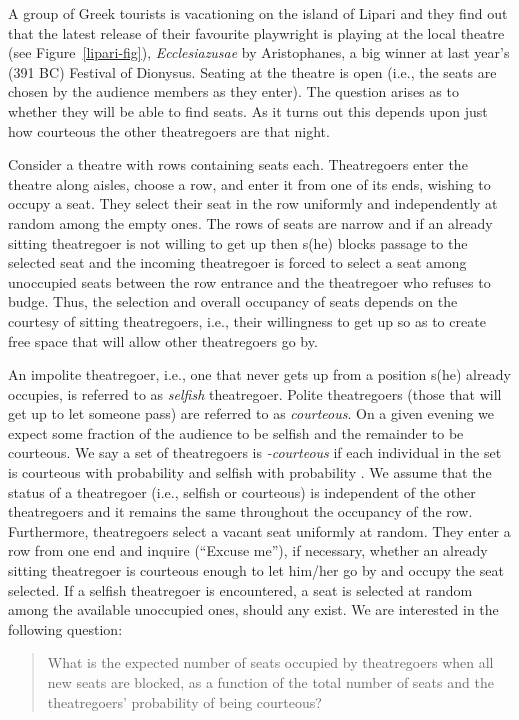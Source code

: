 \documentclass[11pt]{llncs}
\begin{document}
A group of Greek tourists is vacationing on the island of Lipari and they find
out that the latest release of their favourite playwright is playing 
at the local theatre (see Figure~\ref{lipari-fig}), {\em Ecclesiazusae} by Aristophanes, a big winner at last year's (391 BC)
Festival of Dionysus. Seating at the theatre is open (i.e., the seats are chosen by the audience members as 
they enter). The question arises as to whether they will be able to find seats. As it turns out
this depends upon just how courteous the other theatregoers are that night. 



Consider a theatre with  rows containing  seats each. 
Theatregoers enter the theatre along aisles, choose a row, and enter it from one of its ends, wishing
to occupy a seat. They
select their seat in the row uniformly and
independently at random among the empty ones.
The rows of seats are narrow and
if an already sitting theatregoer is not willing to get up
then s(he) blocks passage to the selected seat and the incoming theatregoer
is forced to select a seat among unoccupied seats
between the row entrance and the theatregoer who refuses to budge. 
Thus, the selection and overall occupancy of seats depends on
the courtesy of sitting theatregoers, i.e.,  their
willingness to get up so as to create  free space
that will allow other theatregoers go by.




An impolite theatregoer, i.e., one that never gets up from
a position s(he) already occupies, is referred to as {\em selfish} theatregoer.
Polite theatregoers (those that will get up to let someone pass) are
referred to as {\em courteous}. 
On a given evening we expect some fraction of the audience to be selfish
and the remainder to be courteous. We say a set of theatregoers is
{\em -courteous} 
if each individual in the set is courteous with probability  and 
selfish with probability .
We assume that the status of a
theatregoer (i.e., selfish or courteous)
is independent of the other theatregoers and it
remains the same throughout the
occupancy of the row. Furthermore, theatregoers select a vacant seat uniformly
at random. They enter a row from one end
and inquire (``Excuse me''), if necessary, whether an already
sitting theatregoer is courteous enough to let him/her go by and occupy
the seat selected. If a selfish theatregoer is encountered, a seat is selected
at random among the available unoccupied ones, should any exist. 
We are interested in the following question:
\begin{quote}
What is the expected number of seats
occupied by theatregoers when all
new seats are blocked,
as a function of the total
number of seats and the theatregoers' probability  of being courteous? 
\end{quote}
\end{document}
